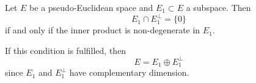 Let $E$ be a pseudo-Euclidean space and $E_1 \subset E$ a subspace. Then
$$E_1 \cap E_1^\perp = \{0\}$$
if and only if the inner product is non-degenerate in $E_1$.

If this condition is fulfilled, then
$$E = E_1 \oplus E_1^\perp$$
since $E_1$ and $E_1^\perp$ have complementary dimension.
